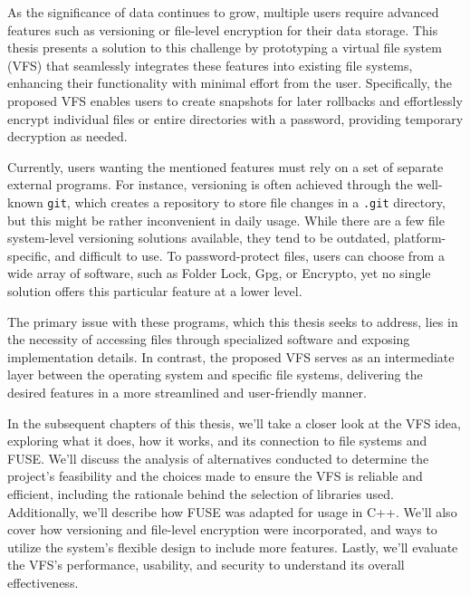 
As the significance of data continues to grow, multiple users require advanced features such as versioning or file-level encryption for their data storage.
This thesis presents a solution to this challenge by prototyping a virtual file system (VFS) that seamlessly integrates these features into existing file systems, enhancing their functionality with minimal effort from the user.
Specifically, the proposed VFS enables users to create snapshots for later rollbacks and effortlessly encrypt individual files or entire directories with a password, providing temporary decryption as needed.

Currently, users wanting the mentioned features must rely on a set of separate external programs.
For instance, versioning is often achieved through the well-known \texttt{git}, which creates a repository to store file changes in a \texttt{.git} directory, but this might be rather inconvenient in daily usage.
While there are a few file system-level versioning solutions available, they tend to be outdated, platform-specific, and difficult to use.
To password-protect files, users can choose from a wide array of software, such as Folder Lock, Gpg, or Encrypto, yet no single solution offers this particular feature at a lower level.

The primary issue with these programs, which this thesis seeks to address, lies in the necessity of accessing files through specialized software and exposing implementation details.
In contrast, the proposed VFS serves as an intermediate layer between the operating system and specific file systems, delivering the desired features in a more streamlined and user-friendly manner.

In the subsequent chapters of this thesis, we'll take a closer look at the VFS idea, exploring what it does, how it works, and its connection to file systems and FUSE. We'll discuss the analysis of alternatives conducted to determine the project's feasibility and the choices made to ensure the VFS is reliable and efficient, including the rationale behind the selection of libraries used.
Additionally, we'll describe how FUSE was adapted for usage in C++.
We'll also cover how versioning and file-level encryption were incorporated, and ways to utilize the system's flexible design to include more features.
Lastly, we'll evaluate the VFS's performance, usability, and security to understand its overall effectiveness.